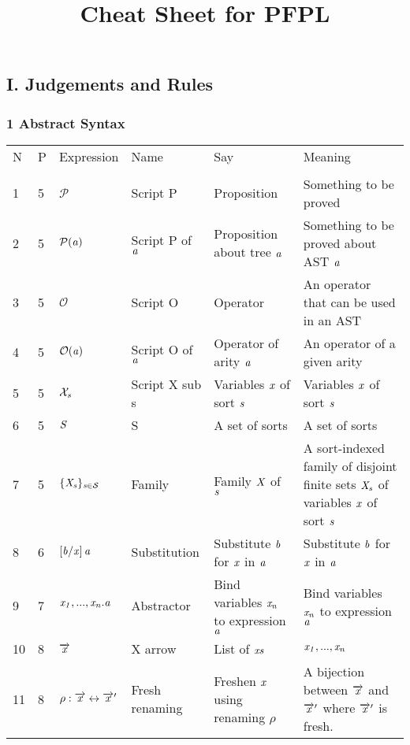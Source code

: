 \documentclass[12pt]{article}
\begin{document}
\title{Cheat Sheet for PFPL}
\maketitle
\subsection*{I. Judgements and Rules}
\subsubsection*{1 Abstract Syntax}
\begin{tabular}[b] {p{} p{} p{} p{} 
p{} p{}}
N & P & Expression & Name & Say & Meaning \\ \\
1& 5& $\mathcal{P}$ & Script P & Proposition & Something to be proved \\
2& 5& $\mathcal{P}(\it{a})$ & Script P of $\it{a}$ & Proposition about tree $\it{a}$ & Something to be proved about AST $\it{a}$ \\
3& 5& $\mathcal{O}$ & Script O & Operator & An operator that can be used in an AST \\
4& 5& $\mathcal{O}(\it{a})$ & Script O of $\it{a}$ & Operator of arity $\it{a}$ & An operator of a given arity \\
5& 5& $\mathcal{X}_{\it{s}}$ & Script X sub s & Variables $\it{x}$ of sort $\it{s}$ & Variables $\it{x}$ of sort $\it{s}$ \\
6& 5& $\it{S} $ & S & A set of sorts & A set of sorts \\
7& 5& $ \{ \it{X}_{s} \} _{\it{s} \in \mathcal{S}}$  & Family & Family $ \it{X} $ of $\it{s}$ & A sort-indexed family of disjoint finite sets $ \it{X}_s $ of variables $\it{x}$ of sort $ \it{s} $\\
8& 6& $\left[ \it{b} / \it{x}\right] \it{a}$ & Substitution & Substitute $\it{b}$ for $\it{x}$ in $\it{a}$ & Substitute  $\it{b}$ for $\it{x}$ in $\it{a}$ \\
9& 7& $ \it{x}_1, ... ,\it{x}_{\it{n}}.\it{a} $ & Abstractor & Bind variables $\it{x_n}$ to expression $\it{a}$ & Bind variables $\it{x_n}$ to expression $\it{a}$ \\
10& 8& $ \overrightarrow{\it{x}} $ & X arrow & List of $\it{x}s$ & $ \it{x}_1, ... ,\it{x}_{\it{n}} $ \\
11& 8& $ \rho : \overrightarrow{\it{x}} \leftrightarrow \overrightarrow{\it{x}}'$ & Fresh renaming & Freshen $ \it{x} $ using renaming $ \rho $ & A bijection between $ \overrightarrow{\it{x}} $ and $ \overrightarrow{\it{x}}' $ where $ \overrightarrow{\it{x}}'$ is fresh. \\

\end{tabular}
\end{document}
